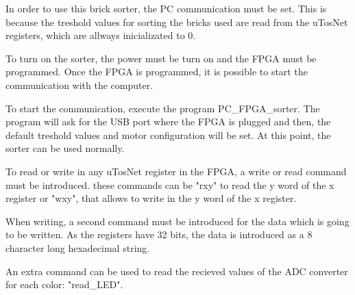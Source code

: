 \label{app:usageguide}


In order to use this brick sorter, the PC communication must be set. This is because the treshold values for sorting the bricks used are read from the uTosNet registers, which are allways inicializated to 0.

To turn on the sorter, the power must be turn on and the FPGA must be programmed.
Once the FPGA is programmed, it is possible to start the communication with the computer.

To start the communication, execute the program PC\_FPGA\_sorter. The program will ask for the USB port where the FPGA is plugged and then, the default treshold values and motor configuration will be set. At this point, the sorter can be used normally.

To read or write in any uTosNet register in the FPGA, a write or read command must be introduced. these commands can be "rxy" to read the y word of the x register or "wxy", that allows to write in the y word of the x register.

When writing, a second command must be introduced for the data which is going to be written. As the registers have 32 bits, the data is introduced as a 8 character long hexadecimal string.

An extra command can be used to read the recieved values of the ADC converter for each color: "read\_LED".



